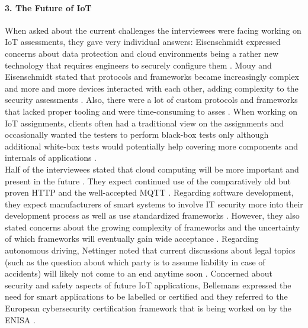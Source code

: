 \paragraph{3. The Future of \ac{IoT}} When asked about the current challenges the interviewees were facing working on \ac{IoT} assessments, they gave very individual answers: Eisenschmidt expressed concerns about data protection and cloud environments being a rather new technology that requires engineers to securely configure them \cite{eisenschmidt_2020}. Mouy and Eisenschmidt stated that protocols and frameworks became increasingly complex and more and more devices interacted with each other, adding complexity to the security assessments \cite{mouy_2020,eisenschmidt_2020}. Also, there were a lot of custom protocols and frameworks that lacked proper tooling and were time-consuming to asses \cite{bellemans_2020,mouy_2020}. When working on \ac{IoT} assignments, clients often had a traditional view on the assignments and occasionally wanted the testers to perform black-box tests only although additional white-box tests would potentially help covering more components and internals of applications \cite{bellemans_2020,bassem_2020,rigas_2020}.\\
Half of the interviewees stated that cloud computing will be more important and present in the future \cite{eisenschmidt_2020,nettinger_2020,mouy_2020}. They expect continued use of the comparatively old but proven \ac{HTTP} \cite{bassem_2020,rigas_2020} and the well-accepted \ac{MQTT} \cite{bassem_2020,rigas_2020,nettinger_2020}. Regarding software development, they expect manufacturers of smart systems to involve IT security more into their development process \cite{bassem_2020,rigas_2020,nettinger_2020} as well as use standardized frameworks \cite{mouy_2020,bassem_2020,rigas_2020}. However, they also stated concerns about the growing complexity of frameworks and the uncertainty of which frameworks will eventually gain wide acceptance \cite{bassem_2020,rigas_2020}. Regarding autonomous driving, Nettinger noted that current discussions about legal topics (such as the question about which party is to  assume liability in case of accidents) will likely not come to an end anytime soon \cite{nettinger_2020}. Concerned about security and safety aspects of future \ac{IoT} applications, Bellemans expressed the need for smart applications to be labelled or certified and they referred to the European cybersecurity certification framework that is being worked on by the \ac{ENISA} \cite{bellemans_2020}.


